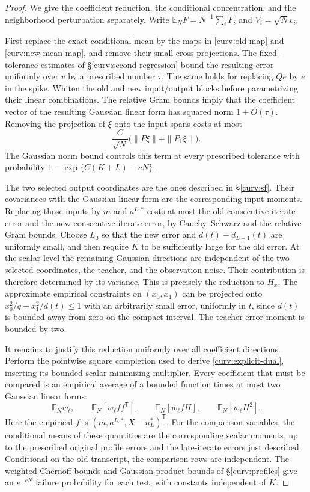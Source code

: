 \documentclass[11pt,reqno]{amsart}
\begin{document}
\begin{proof}
We give the coefficient reduction, the conditional concentration, and
the neighborhood perturbation separately. Write
$\mathbb E_N F=N^{-1}\sum_iF_i$ and $V_i=\sqrt N v_i$.

First replace the exact conditional mean by the maps in
\eqref{curv:old-map} and \eqref{curv:new-mean-map}, and remove their
small cross-projections. The fixed-tolerance estimates of
\S\ref{curv:second-regression} bound the resulting error uniformly
over $v$ by a prescribed number $\tau$. The same holds for replacing
$Qe$ by $e$ in the spike. Whiten the old and new input/output blocks
before parametrizing their linear combinations. The relative Gram
bounds imply that the coefficient vector of the resulting Gaussian
linear form has squared norm $1+O(\tau)$. Removing the projection of
$\xi$ onto the input spans costs at most
\[
 \frac{C}{\sqrt N}\bigl(\|P\xi\|+\|P_1\xi\|\bigr).
\]
The Gaussian norm bound controls this term at every prescribed
tolerance with probability $1-\exp\{C(K+L)-cN\}$.

The two selected output coordinates are the ones described in
\S\ref{curv:sf}. Their covariances with the Gaussian linear form are
the corresponding input moments. Replacing those inputs by $m$ and
$a^{L,*}$ costs at most the old consecutive-iterate error and the new
consecutive-iterate error, by Cauchy--Schwarz and the relative Gram
bounds. Choose $L_0$ so that the new error and
$d(t)-d_{L-1}(t)$ are uniformly small, and then require $K$ to be
sufficiently large for the old error. At the scalar level the remaining
Gaussian directions are independent of the two selected coordinates,
the teacher, and the observation noise. Their contribution is therefore
determined by its variance. This is precisely the reduction to $H_x$.
The approximate empirical constraints on $(x_0,x_1)$ can be projected
onto $x_0^2/q+x_1^2/d(t)\le1$ with an arbitrarily small error, uniformly
in $t$, since $d(t)$ is bounded away from zero on the compact interval.
The teacher-error moment is bounded by two.

It remains to justify this reduction uniformly over all coefficient
directions. Perform the pointwise square completion used to derive
\eqref{curv:explicit-dual}, inserting its bounded scalar minimizing
multiplier. Every coefficient that must be compared is an empirical
average of a bounded function times at most two Gaussian linear forms:
\[
 \mathbb E_N w_\ell,\qquad
 \mathbb E_N[w_\ell ff^{\mathsf T}],\qquad
 \mathbb E_N[w_\ell fH],\qquad
 \mathbb E_N[w_\ell H^2].
\]
Here the empirical $f$ is $(m,a^{L,*},X-n_L^*)^{\mathsf T}$.
For the comparison variables, the conditional means of these quantities
are the corresponding scalar moments, up to the prescribed original
profile errors and the late-iterate errors just described. Conditional
on the old transcript, the comparison rows are independent. The
weighted Chernoff bounds and Gaussian-product bounds of
\S\ref{curv:profiles} give an $e^{-cN}$ failure probability for each
test, with constants independent of $K$.


\end{proof}
\end{document}
